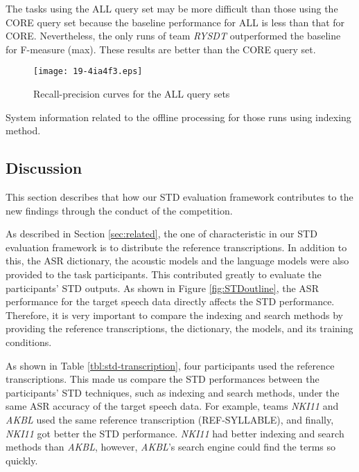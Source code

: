 \documentclass[english]{jnlp_1.4}
\begin{document}
The tasks using the ALL query set may be more difficult than 
those using the CORE query set because the baseline performance 
for ALL is less than that for CORE. 
Nevertheless, the only runs of team {\it RYSDT} outperformed
the baseline for F-measure (max). 
These results are better than the CORE query set.

\begin{figure}[p]
\begin{center}
\texttt{[image: 19-4ia4f3.eps]}
\end{center}
\caption{Recall-precision curves for the ALL query sets}
\label{fig:allset}
\vspace{1\baselineskip}
\end{figure}

\begin{table}[p]
\label{tbl:allset}

\end{table}

\begin{table}[t]
\caption{System information related to the offline processing for those runs using indexing method.}
\label{tbl:offline}

\end{table}



\subsection{Discussion}

This section describes that how our STD evaluation framework contributes 
to the new findings through the conduct of the competition. 

As described in Section \ref{sec:related}, the one of characteristic in 
our STD evaluation framework is to distribute the reference 
transcriptions. In addition to this, the ASR dictionary, the acoustic models 
and the language models were also provided to the task participants. This 
contributed greatly to evaluate the participants' STD outputs. As shown 
in Figure \ref{fig:STDoutline}, the ASR performance for the target 
speech data directly affects the STD performance. Therefore, it is very 
important to compare the indexing and search methods by providing the 
reference transcriptions, the dictionary, the models, and its training 
conditions. 

As shown in Table \ref{tbl:std-transcription}, four participants used 
the reference transcriptions. This made us compare the STD performances 
between the participants' STD techniques, such as indexing and search 
methods, under the same ASR accuracy of the target speech data. For 
example, teams {\it NKI11} and {\it AKBL} used the same reference 
transcription (REF-SYLLABLE), and finally, {\it NKI11} got better the 
STD performance. {\it NKI11} had better indexing and search methods than 
{\it AKBL}, however, {\it AKBL}'s search engine could find the terms so 
quickly. 
\end{document}
